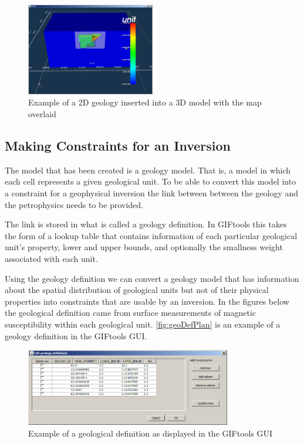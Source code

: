 \begin{figure} [h]
    \centering
    \includegraphics[width=0.5\textwidth]{images/MaptoModel/mapModelCross3D.PNG}
    \caption{Example of a 2D geology inserted into a 3D model with the map overlaid}
    \label{fig:mapModelCross3D}
\end{figure}
\FloatBarrier
\subsection{Making Constraints for an Inversion}
\label{subsec:Making Constraints for an Inversion}

The model that has been created is a geology model. That is, a model in which each cell represents a given geological unit. To be able to convert this model into a constraint for a geophysical inversion the link between between the geology and the petrophysics needs to be provided. 

The link is stored in what is called a geology definition. In GIFtools this takes the form of a lookup table that contains information of each particular geological unit's property, lower and upper bounds, and optionally the smallness weight associated with each unit. 

Using the geology definition we can convert a geology model that has information about the spatial distribution of geological units but not of their physical properties into constraints that are usable by an inversion. In the figures below the geological definition came from surface measurements of magnetic susceptibility within each geological unit. \autoref{fig:geoDefPlan} is an example of a geology definition in the GIFtools GUI.
\begin{figure} [h]
    \centering
    \includegraphics[width=0.8\textwidth]{images/MaptoModel/geoDefPlan.PNG}
    \caption{Example of a geological definition as displayed in the GIFtools GUI}
    \label{fig:geoDefPlan}
\end{figure}

